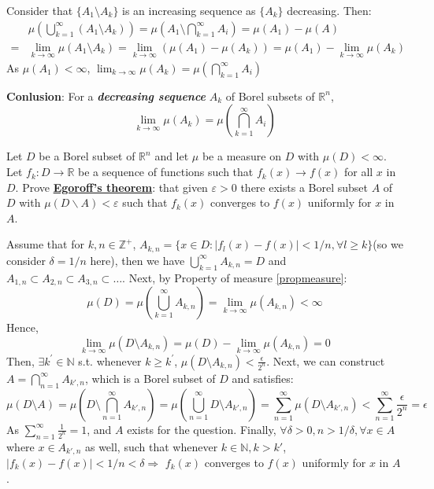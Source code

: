 \begin{customsol}{1.18}
    Consider that $\{A_1\setminus A_k\}$ is an increasing sequence as $\{A_k\}$ decreasing. Then:
    $$ 
    \begin{aligned}
        &\mu\left(\bigcup_{k=1}^{\infty}\left(A_{1}\setminus A_{k}\right)\right) = \mu\left(A_{1} \setminus \bigcap_{k=1}^{\infty} A_{i}\right) = \mu(A_1) - \mu (A) \\
        =&\lim _{k \rightarrow \infty} \mu\left(A_{1} \setminus A_{k}\right) = \lim_{k\rightarrow\infty} (\mu(A_1)-\mu (A_k)) = \mu(A_1) - \lim_{k\rightarrow\infty} \mu(A_k)
    \end{aligned}$$
    As $\mu(A_1)<\infty$, $\displaystyle \lim_{k\rightarrow \infty} \mu(A_k) = \mu(\bigcap_{k=1}^{\infty} A_{i})$
\end{customsol}

\textbf{Conlusion}: For a \textbf{\textit{decreasing sequence}} $A_k$ of Borel subsets of $\mathbb{R}^n$, 
$$\displaystyle \lim_{k\rightarrow \infty} \mu(A_k) = \mu(\bigcap_{k=1}^{\infty} A_{i})$$


\begin{customexercise}{1.23}
    Let $D$ be a Borel subset of $\mathbb{R}^{n}$ and let $\mu$ be a measure 
    on $D$ with $\mu(D)<\infty$. Let $f_{k}: D \rightarrow \mathbb{R}$ be a 
    sequence of functions such that $f_{k}(x) \rightarrow f(x)$ for all $x$ 
    in $D$. Prove \underline{\textbf{Egoroff's theorem}}: that given $\varepsilon>0$ there exists 
    a Borel subset $A$ of $D$ with $\mu(D \backslash A)<\varepsilon$ such that 
    $f_{k}(x)$ converges to $f(x)$ uniformly for $x$ in $A$.
\end{customexercise}

\begin{customsol}{1.23} 
    Assume that for $k, n \in \mathbb{Z}^+$, $A_{k, n} = \{x\in D: |f_l(x) - f(x)| < 1/n, \forall l\geq k\}$(so we consider $\delta = 1/n$ here), 
    then we have $\displaystyle \bigcup_{k=1}^\infty A_{k, n} = D$ and 
    $A_{1, n}\subset A_{2, n}\subset A_{3, n}\subset\dots$. Next, by Property of measure \ref{propmeasure}:
    $$\displaystyle \mu(D) = \mu(\bigcup_{k=1}^\infty A_{k,n}) = \lim_{k\rightarrow\infty}\mu(A_{k,n})<\infty$$
    Hence, 
    $$\displaystyle \lim_{k\rightarrow\infty}\mu(D\setminus A_{k,n}) = \mu(D) - \lim_{k\rightarrow\infty} \mu(A_{k, n}) = 0$$
    Then, $\exists k^\prime \in \mathbb{N}$  s.t. whenever 
    $k\geq k^\prime$, $\mu(D\setminus A_{k,n}) < \displaystyle \frac{\epsilon}{2^n}$. 
    Next, we can construct $\displaystyle A = \bigcap_{n = 1}^\infty A_{k',n}$, which is a Borel subset of $D$ and satisfies:
    $$\mu(D\setminus A) = \mu(D\setminus \bigcap_{n=1}^\infty A_{k', n}) = \mu(\bigcup_{n=1}^\infty D\setminus A_{k',n}) = \sum_{n=1}^\infty \mu(D\setminus A_{k',n}) < \sum_{n=1}^\infty \frac{\epsilon}{2^n} = \epsilon$$
    As $\displaystyle \sum_{n=1}^{\infty} \frac{1}{2^n} = 1$, and $A$ exists for the question. 
    Finally, $\forall\delta > 0, n > 1/\delta, \forall x\in A$ where $x\in A_{k', n}$ as well, such that whenever $k\in\mathbb{N}, k>k'$, $|f_k(x) - f(x)| < 1/n < \delta\Rightarrow$ $f_k(x)$ converges to $f(x)$ uniformly for $x$ in $A$.
    
    \end{customsol}

